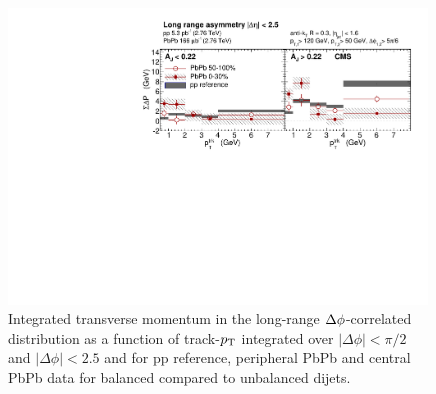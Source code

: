 \begin{figure}[h!]
\begin{center} 
\includegraphics[width=0.99\textwidth]{figures/Results/Integral_Longrange.pdf}
\caption[Integrated transverse momentum in the long-range $\protect\Delta\phi$-correlated distribution as a function of track-$p_{\rm T}$]{Integrated transverse momentum in the long-range $\protect\Delta\phi$-correlated distribution as a function of track-$p_{\rm T}$ integrated over $|\Delta\phi| < \pi/2$  and $|\Delta\phi| < 2.5$ and for pp reference, peripheral PbPb and central PbPb data for balanced compared to unbalanced dijets.}
\label{fig:Integral_Longrange} 
\end{center} 
\end{figure} 


